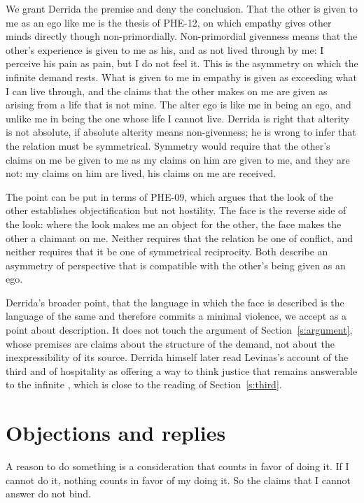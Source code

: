 \documentclass{situationist-preprint}
\begin{document}
We grant Derrida the premise and deny the conclusion. That the other is given to me as an ego like me is the thesis of PHE-12, on which empathy gives other minds directly though non-primordially. Non-primordial givenness means that the other's experience is given to me as his, and as not lived through by me: I perceive his pain as pain, but I do not feel it. This is the asymmetry on which the infinite demand rests. What is given to me in empathy is given as exceeding what I can live through, and the claims that the other makes on me are given as arising from a life that is not mine. The alter ego is like me in being an ego, and unlike me in being the one whose life I cannot live. Derrida is right that alterity is not absolute, if absolute alterity means non-givenness; he is wrong to infer that the relation must be symmetrical. Symmetry would require that the other's claims on me be given to me as my claims on him are given to me, and they are not: my claims on him are lived, his claims on me are received.

The point can be put in terms of PHE-09, which argues that the look of the other establishes objectification but not hostility. The face is the reverse side of the look: where the look makes me an object for the other, the face makes the other a claimant on me. Neither requires that the relation be one of conflict, and neither requires that it be one of symmetrical reciprocity. Both describe an asymmetry of perspective that is compatible with the other's being given as an ego.

Derrida's broader point, that the language in which the face is described is the language of the same and therefore commits a minimal violence, we accept as a point about description. It does not touch the argument of Section~\ref{s:argument}, whose premises are claims about the structure of the demand, not about the inexpressibility of its source. Derrida himself later read Levinas's account of the third and of hospitality as offering a way to think justice that remains answerable to the infinite \citep{Derrida1997}, which is close to the reading of Section~\ref{s:third}.

\section{Objections and replies}

\begin{objection}
A reason to do something is a consideration that counts in favor of doing it. If I cannot do it, nothing counts in favor of my doing it. So the claims that I cannot answer do not bind.
\end{objection}
\end{document}
